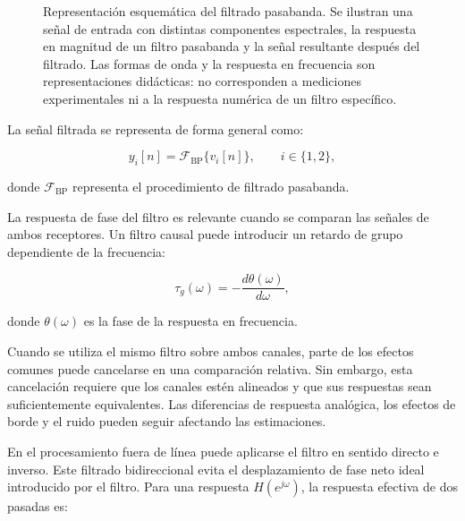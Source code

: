 \begin{figure}[htbp]

    \caption{Representación esquemática del filtrado pasabanda.
    Se ilustran una señal de entrada con distintas componentes
    espectrales, la respuesta en magnitud de un filtro pasabanda
    y la señal resultante después del filtrado. Las formas de onda
    y la respuesta en frecuencia son representaciones didácticas:
    no corresponden a mediciones experimentales ni a la respuesta
    numérica de un filtro específico.}
    \label{fig:filtrado_pasabanda}
\end{figure}


La señal filtrada se representa de forma general como:

\begin{equation}
    y_i[n]
    =
    \mathcal{F}_{\mathrm{BP}}\{v_i[n]\},
    \qquad i\in\{1,2\},
    \label{eq:filtro_pasabanda}
\end{equation}

donde $\mathcal{F}_{\mathrm{BP}}$ representa el procedimiento de
filtrado pasabanda.

La respuesta de fase del filtro es relevante cuando se comparan las
señales de ambos receptores. Un filtro causal puede introducir un
retardo de grupo dependiente de la frecuencia:

\begin{equation}
    \tau_g(\omega)
    =
    -\frac{d\theta(\omega)}{d\omega},
    \label{eq:retardo_grupo}
\end{equation}

donde $\theta(\omega)$ es la fase de la respuesta en frecuencia.

Cuando se utiliza el mismo filtro sobre ambos canales, parte de los
efectos comunes puede cancelarse en una comparación relativa. Sin
embargo, esta cancelación requiere que los canales estén alineados y
que sus respuestas sean suficientemente equivalentes. Las diferencias
de respuesta analógica, los efectos de borde y el ruido pueden seguir
afectando las estimaciones.

En el procesamiento fuera de línea puede aplicarse el filtro en sentido
directo e inverso. Este filtrado bidireccional evita el desplazamiento de
fase neto ideal introducido por el filtro. Para una respuesta
$H(e^{j\omega})$, la respuesta efectiva de dos pasadas es:

